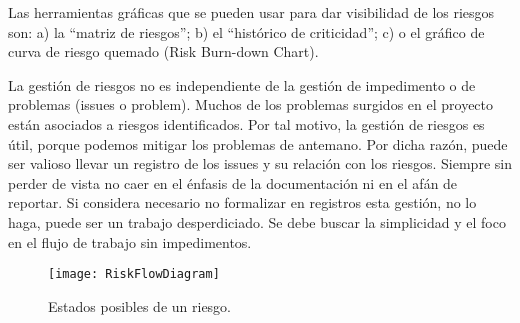 Las herramientas gráficas que se pueden usar para dar visibilidad de los riesgos son: a) la “matriz de riesgos”; b) el “histórico de criticidad”; c) o el gráfico de curva de riesgo quemado (Risk Burn-down Chart).

La gestión de riesgos no es independiente de la gestión de impedimento o de problemas (issues o problem). Muchos de los problemas surgidos en el proyecto están asociados a riesgos identificados. Por tal motivo, la gestión de riesgos es útil, porque podemos mitigar los problemas de antemano. Por dicha razón, puede ser valioso llevar un registro de los issues y su relación con los riesgos. Siempre sin perder de vista no caer en el énfasis de la documentación ni en el afán de reportar. Si considera necesario no formalizar en registros esta gestión, no lo haga, puede ser un trabajo desperdiciado. Se debe buscar la simplicidad y el foco en el flujo de trabajo sin impedimentos.

\begin{figure}[h]
  \centering
  \texttt{[image: RiskFlowDiagram]}
  \caption{Estados posibles de un riesgo.}
  \centering
  \label{fig:RiskFlowDiagram} %
\end{figure}
\FloatBarrier %
